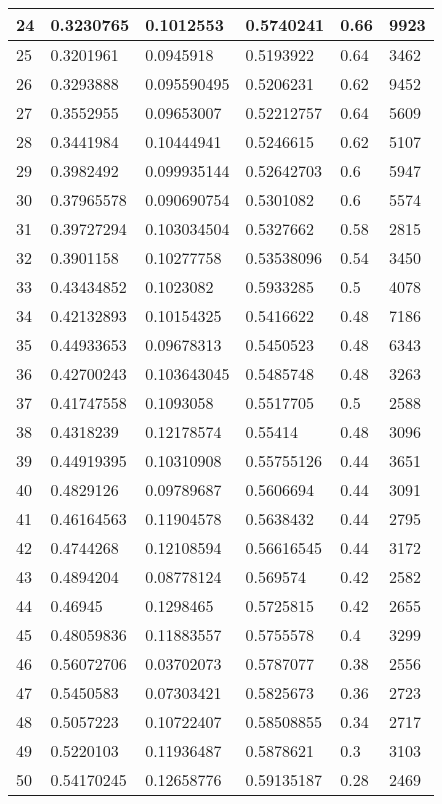 \begin{longtable}{|l|l|l|l|l|l|}
24 & 0.3230765 & 0.1012553 & 0.5740241 & 0.66 & 9923 \\ \hline 
25 & 0.3201961 & 0.0945918 & 0.5193922 & 0.64 & 3462 \\ \hline 
26 & 0.3293888 & 0.095590495 & 0.5206231 & 0.62 & 9452 \\ \hline 
27 & 0.3552955 & 0.09653007 & 0.52212757 & 0.64 & 5609 \\ \hline 
28 & 0.3441984 & 0.10444941 & 0.5246615 & 0.62 & 5107 \\ \hline 
29 & 0.3982492 & 0.099935144 & 0.52642703 & 0.6 & 5947 \\ \hline 
30 & 0.37965578 & 0.090690754 & 0.5301082 & 0.6 & 5574 \\ \hline 
31 & 0.39727294 & 0.103034504 & 0.5327662 & 0.58 & 2815 \\ \hline 
32 & 0.3901158 & 0.10277758 & 0.53538096 & 0.54 & 3450 \\ \hline 
33 & 0.43434852 & 0.1023082 & 0.5933285 & 0.5 & 4078 \\ \hline 
34 & 0.42132893 & 0.10154325 & 0.5416622 & 0.48 & 7186 \\ \hline 
35 & 0.44933653 & 0.09678313 & 0.5450523 & 0.48 & 6343 \\ \hline 
36 & 0.42700243 & 0.103643045 & 0.5485748 & 0.48 & 3263 \\ \hline 
37 & 0.41747558 & 0.1093058 & 0.5517705 & 0.5 & 2588 \\ \hline 
38 & 0.4318239 & 0.12178574 & 0.55414 & 0.48 & 3096 \\ \hline 
39 & 0.44919395 & 0.10310908 & 0.55755126 & 0.44 & 3651 \\ \hline 
40 & 0.4829126 & 0.09789687 & 0.5606694 & 0.44 & 3091 \\ \hline 
41 & 0.46164563 & 0.11904578 & 0.5638432 & 0.44 & 2795 \\ \hline 
42 & 0.4744268 & 0.12108594 & 0.56616545 & 0.44 & 3172 \\ \hline 
43 & 0.4894204 & 0.08778124 & 0.569574 & 0.42 & 2582 \\ \hline 
44 & 0.46945 & 0.1298465 & 0.5725815 & 0.42 & 2655 \\ \hline 
45 & 0.48059836 & 0.11883557 & 0.5755578 & 0.4 & 3299 \\ \hline 
46 & 0.56072706 & 0.03702073 & 0.5787077 & 0.38 & 2556 \\ \hline 
47 & 0.5450583 & 0.07303421 & 0.5825673 & 0.36 & 2723 \\ \hline 
48 & 0.5057223 & 0.10722407 & 0.58508855 & 0.34 & 2717 \\ \hline 
49 & 0.5220103 & 0.11936487 & 0.5878621 & 0.3 & 3103 \\ \hline 
50 & 0.54170245 & 0.12658776 & 0.59135187 & 0.28 & 2469 \\ \hline 
\end{longtable}